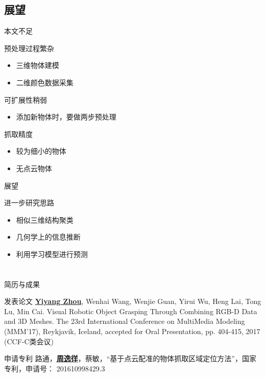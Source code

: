 \documentclass[xcolor=table,compress,blue]{beamer}
\begin{document}
\subsection{展望}
\begin{frame}{本文不足}
	\begin{exampleblock}{预处理过程繁杂}
		\begin{itemize}
			\item 三维物体建模
			\item 二维颜色数据采集
		\end{itemize}
	\end{exampleblock}
	\begin{exampleblock}{可扩展性稍弱}
		\begin{itemize}
			\item 添加新物体时，要做两步预处理
		\end{itemize}
	\end{exampleblock} 
	 \begin{exampleblock}{抓取精度}
	 	\begin{itemize}
	 		\item 较为细小的物体
	 		\item 无点云物体
	 	\end{itemize}
	 \end{exampleblock}
 
\end{frame}	

\begin{frame}{展望}
	\begin{exampleblock}{进一步研究思路}
		\begin{itemize}
			\item 相似三维结构聚类
			\item 几何学上的信息推断
			\item 利用学习模型进行预测
		\end{itemize}
	\end{exampleblock}
\end{frame}


\section{}
\begin{frame}{简历与成果}
	\begin{exampleblock}{发表论文}
		\textbf{\underline{Yiyang Zhou}}, Wenhai Wang, Wenjie Guan, Yirui Wu, Heng Lai, Tong Lu, Min Cai. Visual Robotic Object Grasping Through Combining RGB-D Data and 3D Meshes. The 23rd International Conference on MultiMedia Modeling (MMM’17), Reykjavik, Iceland, accepted for Oral Presentation, pp. 404-415, 2017 (CCF-C类会议)
	\end{exampleblock}
	\begin{exampleblock}{申请专利}
		路通，\textbf{\underline{周逸徉}}，蔡敏，“基于点云配准的物体抓取区域定位方法”，国家专利，申请号： 201610998429.3
	\end{exampleblock}
\end{frame}
\end{document}
